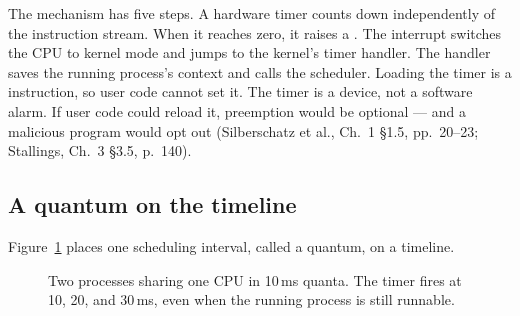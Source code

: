 \documentclass[11pt]{article}
\begin{document}
The mechanism has five steps. A hardware timer counts down independently of the instruction stream. When it reaches zero, it raises a . The interrupt switches the CPU to kernel mode and jumps to the kernel's timer handler. The handler saves the running process's context and calls the scheduler. Loading the timer is a  instruction, so user code cannot set it. The timer is a device, not a software alarm. If user code could reload it, preemption would be optional --- and a malicious program would opt out (Silberschatz et al., Ch.~1 §1.5, pp.~20--23; Stallings, Ch.~3 §3.5, p.~140).

\subsection*{A quantum on the timeline}

Figure~\ref{fig:quantum} places one scheduling interval, called a quantum, on a timeline.

\begin{figure}[h]
  \centering
  \caption{Two processes sharing one CPU in 10\,ms quanta. The timer fires at 10, 20, and 30\,ms, even when the running process is still runnable.}
  \label{fig:quantum}
\end{figure}
\end{document}
